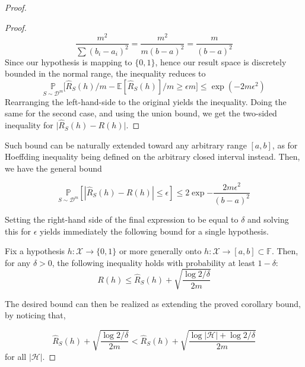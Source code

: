 \documentclass[
  journal=largetwo,
  year=2025,
  volume=37,
]{cup-journal}
\begin{document}
\begin{proof}
\begin{proof}
\begin{equation*}
        \frac{m^{2}}{\sum (b_{i} - a_{i})^{2}} = \frac{m^{2}}{m(b-a)^{2}} = \frac{m}{(b-a)^{2}}
    \end{equation*}
    Since our hypothesis is mapping to $\{0,1\}$, hence our result space is discretely bounded in the normal range, the inequality reduces to 
    \begin{equation}
        \underset{S\sim \mathcal{D}^{m}}{\mathbb{P}} \Big[ \hat{R}_{S}(h)/m - \mathbb{E}[\hat{R}_{S}(h)]/m \geq \epsilon m \Big] \leq \exp{\left(-2m\epsilon^{2}\right)}
    \end{equation}
    Rearranging the left-hand-side to the original yields the inequality. Doing the same for the second case, and using the union bound, we get the two-sided inequality for $\lvert \hat{R}_{S}(h) - R(h)\rvert$. 
\end{proof}

Such bound can be naturally extended toward any arbitrary range $[a,b]$, as for Hoeffding inequality being defined on the arbitrary closed interval instead. Then, we have the general bound

\begin{equation}
    \underset{S\sim \mathcal{D}^m}{\mathbb{P}} \left[|\hat{R}_S (h) - R(h)| \leq \epsilon\right] \leq 2\exp{-\frac{2m\epsilon^2}{(b-a)^{2}}}
\end{equation}

Setting the right-hand side of the final expression to be equal to $\delta$ and solving this for $\epsilon$ yields immediately the following bound for a single hypothesis. 

\begin{col}
    Fix a hypothesis $h: \mathcal{X}\to \{0,1\}$ or more generally onto $h:\mathcal{X}\to[a,b]\subset\mathbb{F}$. Then, for any $\delta > 0$, the following inequality holds with probability at least $1-\delta$: 
    \begin{equation}
        R(h) \leq \hat{R}_S(h) + \sqrt{\frac{\log{2/\delta}}{2m}}
    \end{equation}
\end{col}

The desired bound can then be realized as extending the proved corollary bound, by noticing that,  

\begin{equation}
        \hat{R}_S(h) + \sqrt{\frac{\log{2/\delta}}{2m}} < \hat{R}_S (h) + \sqrt{\frac{\log{|\mathcal{H}|}+ \log{2/\delta}}{2m}}
    \end{equation}
for all $|\mathcal{H}|$. 
\end{proof}
\end{document}
